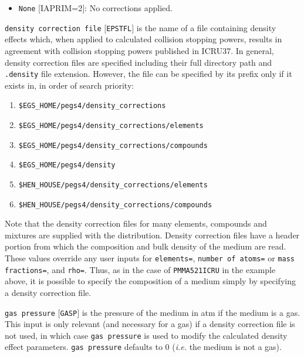 \documentclass[12pt,twoside]{article}
\begin{document}
\begin{description}
\begin{description}
\begin{itemize}
{\tt \$HEN\_HOUSE/pegs4/aprime.data}.
\item {\tt None} $[$IAPRIM=2$]$: No corrections applied.
\end{itemize}
\item {\tt density correction file} $[${\tt EPSTFL}$]$ is the name of a file containing density effects which, when applied to calculated collision
stopping powers, results in agreement with collision stopping powers published in ICRU37\cite{ICRU37}.  In general, density correction files are specified including their full directory path and {\tt .density} file extension.  However,
the file can be specified by its prefix only if it
exists in, in order of search priority:
\begin{enumerate}
\item {\tt \$EGS\_HOME/pegs4/density\_corrections}
\item {\tt \$EGS\_HOME/pegs4/density\_corrections/elements}
\item {\tt \$EGS\_HOME/pegs4/density\_corrections/compounds}
\item {\tt \$EGS\_HOME/pegs4/density}
\item {\tt \$HEN\_HOUSE/pegs4/density\_corrections/elements}
\item {\tt \$HEN\_HOUSE/pegs4/density\_corrections/compounds}
\end{enumerate}
Note that the density correction files for many elements, compounds
and mixtures are supplied with
the distribution.  Density correction files have a header portion from which the composition and bulk density of the medium are read.  These values override
any user inputs for {\tt elements=}, {\tt number of atoms=} or {\tt mass fractions=}, and {\tt rho=}.  Thus, as in the case of
{\tt PMMA521ICRU} in the example above, it is possible to specify the composition
of a medium simply by specifying a density correction file.
\item {\tt gas pressure} $[${\tt GASP}$]$ is the pressure of the medium in atm
if the medium is a gas.  This input is only relevant (and necessary
for a gas) if
a density correction file is not used, in which case {\tt gas pressure} is used to modify the calculated density effect parameters.
{\tt gas pressure} defaults to 0 ({\em i.e.} the medium is not a gas).
\end{description}
\end{description}
\end{document}

